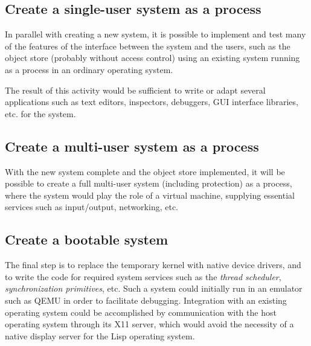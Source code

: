 \subsection{Create a single-user system as a \unix{} process}

In parallel with creating a new \commonlisp{} system, it is possible to
implement and test many of the features of the interface between the
system and the users, such as the object store (probably without
access control) using an existing \commonlisp{} system running as a process in
an ordinary operating system.  

The result of this activity would be sufficient to write or adapt
several applications such as text editors, inspectors, debuggers, GUI
interface libraries, etc. for the system.

\subsection{Create a multi-user system as a \unix{} process}

With the new \commonlisp{} system complete and the object store implemented,
it will be possible to create a full multi-user system (including
protection) as a \unix{} process, where the \unix{} system would play
the role of a virtual machine, supplying essential services such as
input/output, networking, etc. 

\subsection{Create a bootable system}

The final step is to replace the temporary \unix{} kernel with native
device drivers, and to write the code for required system services
such as the \emph{thread scheduler}, \emph{synchronization
  primitives}, etc.  Such a system could initially run in an emulator
such as QEMU in order to facilitate debugging.  Integration with an
existing operating system could be accomplished by communication with
the host operating system through its X11 server, which would avoid
the necessity of a native display server for the Lisp operating
system. 
